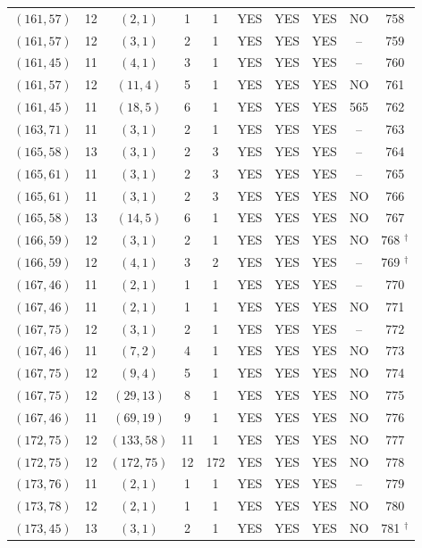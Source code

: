 \begin{longtable}{|c|c|c|c|c|c|c|c|c|c|}
$(161, 57)$ & 12 & $(2, 1)$ & 1 & 1 & YES & YES & YES & NO & 758\\
$(161, 57)$ & 12 & $(3, 1)$ & 2 & 1 & YES & YES & YES & -- & 759\\
$(161, 45)$ & 11 & $(4, 1)$ & 3 & 1 & YES & YES & YES & -- & 760\\
$(161, 57)$ & 12 & $(11, 4)$ & 5 & 1 & YES & YES & YES & NO & 761\\
$(161, 45)$ & 11 & $(18, 5)$ & 6 & 1 & YES & YES & YES & 565 & 762\\
$(163, 71)$ & 11 & $(3, 1)$ & 2 & 1 & YES & YES & YES & -- & 763\\
$(165, 58)$ & 13 & $(3, 1)$ & 2 & 3 & YES & YES & YES & -- & 764\\
$(165, 61)$ & 11 & $(3, 1)$ & 2 & 3 & YES & YES & YES & -- & 765\\
$(165, 61)$ & 11 & $(3, 1)$ & 2 & 3 & YES & YES & YES & NO & 766\\
$(165, 58)$ & 13 & $(14, 5)$ & 6 & 1 & YES & YES & YES & NO & 767\\
$(166, 59)$ & 12 & $(3, 1)$ & 2 & 1 & YES & YES & YES & NO & 768 ${}^\dagger$\\
$(166, 59)$ & 12 & $(4, 1)$ & 3 & 2 & YES & YES & YES & -- & 769 ${}^\dagger$\\
$(167, 46)$ & 11 & $(2, 1)$ & 1 & 1 & YES & YES & YES & -- & 770\\
$(167, 46)$ & 11 & $(2, 1)$ & 1 & 1 & YES & YES & YES & NO & 771\\
$(167, 75)$ & 12 & $(3, 1)$ & 2 & 1 & YES & YES & YES & -- & 772\\
$(167, 46)$ & 11 & $(7, 2)$ & 4 & 1 & YES & YES & YES & NO & 773\\
$(167, 75)$ & 12 & $(9, 4)$ & 5 & 1 & YES & YES & YES & NO & 774\\
$(167, 75)$ & 12 & $(29, 13)$ & 8 & 1 & YES & YES & YES & NO & 775\\
$(167, 46)$ & 11 & $(69, 19)$ & 9 & 1 & YES & YES & YES & NO & 776\\
$(172, 75)$ & 12 & $(133, 58)$ & 11 & 1 & YES & YES & YES & NO & 777\\
$(172, 75)$ & 12 & $(172, 75)$ & 12 & 172 & YES & YES & YES & NO & 778\\
$(173, 76)$ & 11 & $(2, 1)$ & 1 & 1 & YES & YES & YES & -- & 779\\
$(173, 78)$ & 12 & $(2, 1)$ & 1 & 1 & YES & YES & YES & NO & 780\\
$(173, 45)$ & 13 & $(3, 1)$ & 2 & 1 & YES & YES & YES & NO & 781 ${}^\dagger$\\

\end{longtable}

